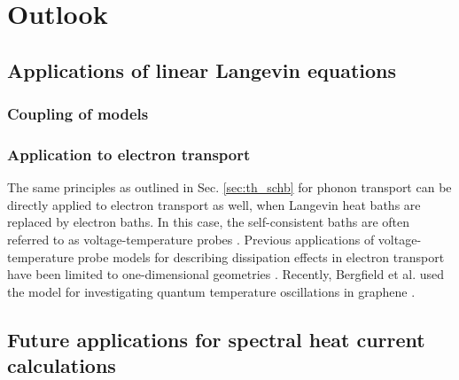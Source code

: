 
\chapter{Outlook}


\section{Applications of linear Langevin equations}

\subsection{Coupling of models}

\subsection{Application to electron transport}


The same principles as outlined in Sec. \ref{sec:th_schb} for phonon transport can be directly applied to electron transport as well, when Langevin heat baths are replaced by electron baths. In this case, the self-consistent baths are often referred to as voltage-temperature probes \cite{jacquet09}. Previous applications of voltage-temperature probe models for describing dissipation effects in electron transport have been limited to one-dimensional geometries \cite{buttiker86,damato90,jacquet09,jacquet12}. Recently, Bergfield et al. used the model for investigating quantum temperature oscillations in graphene \cite{bergfield15}.

\section{Future applications for spectral heat current calculations}